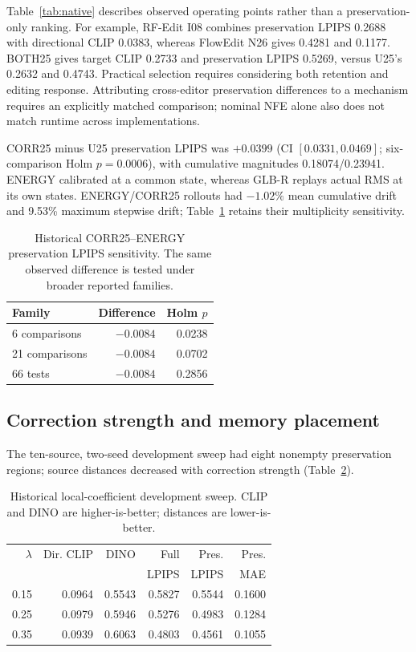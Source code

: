 \documentclass[10pt,doubleanonymous]{ieeeconf}
\begin{document}
Table~\ref{tab:native} describes observed operating points rather than a preservation-only ranking. For example, RF-Edit I08 combines preservation LPIPS 0.2688 with directional CLIP 0.0383, whereas FlowEdit N26 gives 0.4281 and 0.1177. BOTH25 gives target CLIP 0.2733 and preservation LPIPS 0.5269, versus U25's 0.2632 and 0.4743. Practical selection requires considering both retention and editing response. Attributing cross-editor preservation differences to a mechanism requires an explicitly matched comparison; nominal NFE alone also does not match runtime across implementations.

CORR25 minus U25 preservation LPIPS was $+0.0399$ (CI $[0.0331,0.0469]$; six-comparison Holm $p=0.0006$), with cumulative magnitudes 0.18074/0.23941. ENERGY calibrated at a common state, whereas GLB-R replays actual RMS at its own states. ENERGY/CORR25 rollouts had $-1.02\%$ mean cumulative drift and 9.53\% maximum stepwise drift; Table~\ref{tab:old-multiplicity} retains their multiplicity sensitivity.

\begin{table}[!t]
\centering\small
\caption{Historical CORR25--ENERGY preservation LPIPS sensitivity. The same observed difference is tested under broader reported families.}
\label{tab:old-multiplicity}
\begin{tabular}{lrr}
\toprule
Family & Difference & Holm $p$\\
\midrule
6 comparisons &$-0.0084$&0.0238\\
21 comparisons &$-0.0084$&0.0702\\
66 tests &$-0.0084$&0.2856\\
\bottomrule
\end{tabular}
\end{table}

\subsection{Correction strength and memory placement}
The ten-source, two-seed development sweep had eight nonempty preservation regions; source distances decreased with correction strength (Table~\ref{tab:dose}).

\begin{table}[!t]
\centering\footnotesize
\setlength{\tabcolsep}{3pt}
\caption{Historical local-coefficient development sweep. CLIP and DINO are higher-is-better; distances are lower-is-better.}
\label{tab:dose}
\begin{tabular}{rrrrrr}
\toprule
$\lambda$ & Dir. CLIP & DINO & Full & Pres. & Pres.\\
 & & & LPIPS & LPIPS & MAE\\
\midrule
0.15&0.0964&0.5543&0.5827&0.5544&0.1600\\
0.25&0.0979&0.5946&0.5276&0.4983&0.1284\\
0.35&0.0939&0.6063&0.4803&0.4561&0.1055\\
\bottomrule
\end{tabular}
\end{table}
\end{document}
